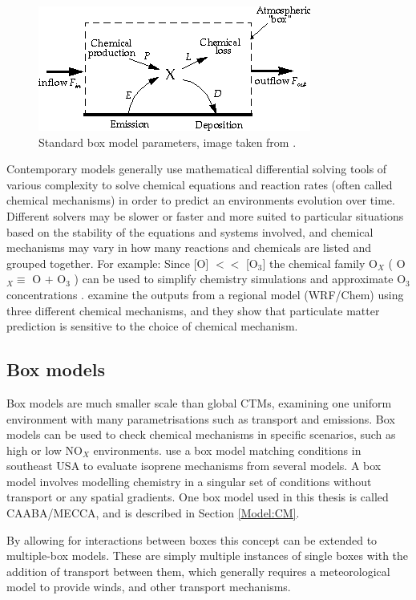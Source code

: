   \begin{figure}
    \includegraphics{Figures/boxmodel.png}
    \caption{ %
      Standard box model parameters, image taken from \cite{Jacob_1999_book}. }
    \label{LR:Models:fig_boxmodel}
  \end{figure}
  
  
  Contemporary models generally use mathematical differential solving tools of various complexity to solve chemical equations and reaction rates (often called chemical mechanisms) in order to predict an environments evolution over time.
  Different solvers may be slower or faster and more suited to particular situations based on the stability of the equations and systems involved, and chemical mechanisms may vary in how many reactions and chemicals are listed and grouped together.
  For example: Since [O] $<<$ [O$_3$] the chemical family O$_X$ (  O$_X \equiv $ O $+$ O$_3$ ) can be used to simplify chemistry simulations and approximate O$_3$ concentrations \citep[][Chapter 3]{BrasseurJacob2017}.
  \cite{Zhang2012} examine the outputs from a regional model (WRF/Chem) using three different chemical mechanisms, and they show that particulate matter prediction is sensitive to the choice of chemical mechanism. 
  
  
  \subsection{Box models}
    Box models are much smaller scale than global CTMs, examining one uniform environment with many parametrisations such as transport and emissions.
    Box models can be used to check chemical mechanisms in specific scenarios, such as high or low NO$_X$ environments.
    \cite{Marvin2017} use a box model matching conditions in southeast USA to evaluate isoprene mechanisms from several models.  
    A box model involves modelling chemistry in a singular set of conditions without transport or any spatial gradients.
    One box model used in this thesis is called CAABA/MECCA, and is described in Section \ref{Model:CM}.
    
    By allowing for interactions between boxes this concept can be extended to multiple-box models.
    These are simply multiple instances of single boxes with the addition of transport between them, which generally requires a meteorological model to provide winds, and other transport mechanisms.
  
